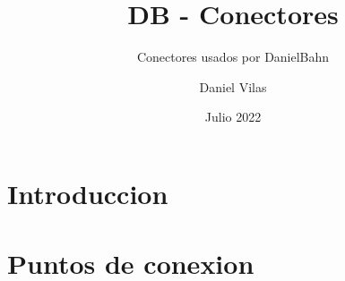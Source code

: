 \documentclass[spanish]{DccDiyTools}
\title{DB - Conectores}
\subtitle{Conectores usados por DanielBahn}
\author{Daniel Vilas}
\date{Julio 2022}
\begin{document}
\maketitle
\section{Introduccion}

\newpage
\section{Puntos de conexion}

\end{document}
